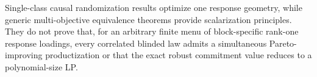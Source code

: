 Single-class causal randomization results optimize one response geometry, while generic multi-objective equivalence theorems provide scalarization principles. They do not prove that, for an arbitrary finite menu of block-specific rank-one response loadings, every correlated blinded law admits a simultaneous Pareto-improving productization or that the exact robust commitment value reduces to a polynomial-size LP.